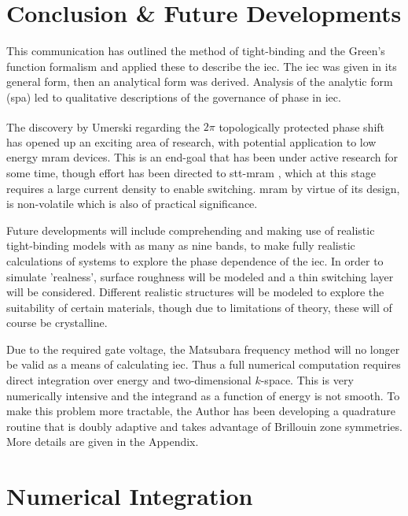 \documentclass[a4paper, 12pt]{article}
\begin{document}
	\section{Conclusion \& Future Developments}
	\par This communication has outlined the method of tight-binding and the Green's function formalism and applied these to describe the \gls{iec}. The \gls{iec} was given in its general form, then an analytical form was derived. Analysis of the analytic form (\gls{spa}) led to qualitative descriptions of the governance of phase in \gls{iec}. 
	\\\par The discovery by Umerski\textsuperscript{\textcolor{blue}{\cite{AUphase}}} regarding the $2\pi$ topologically protected phase shift has opened up an exciting area of research, with potential application to low energy \gls{mram} devices. This is an end-goal that has been under active research for some time, though effort has been directed to \gls{stt}-\gls{mram} , which at this stage requires a large current density to enable switching. \gls{mram} by virtue of its design, is non-volatile which is also of practical significance.
	\\\par Future developments will include comprehending and making use of realistic tight-binding models with as many as nine bands, to make fully realistic calculations of systems to explore the phase dependence of the \gls{iec}.
In order to simulate 'realness', surface roughness will be modeled and a thin switching layer will be considered.
Different realistic structures will be modeled to explore the suitability of certain materials, though due to limitations of theory, these will of course be crystalline.
\\\par Due to the required gate voltage, the Matsubara frequency method will no longer be valid as a means of calculating \gls{iec}.
Thus a full numerical computation requires direct integration over energy and two-dimensional $k$-space. This is very numerically intensive and the integrand as a function of energy is not smooth.
To make this problem more tractable, the Author has been developing a quadrature routine that is doubly adaptive and takes advantage of Brillouin zone symmetries.
More details are given in the Appendix.

	\appendix
	\section{Numerical Integration}
\end{document}
